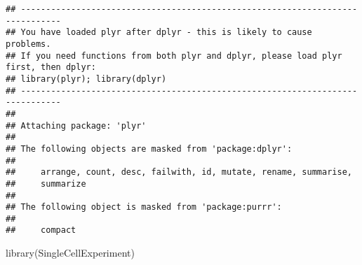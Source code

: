 \documentclass[
]{article}
\newenvironment{Shaded}{\begin{snugshade}}{\end{snugshade}}
\newcommand{\FunctionTok}[1]{\textcolor[rgb]{0.00,0.00,0.00}{#1}}
\newcommand{\NormalTok}[1]{#1}
\begin{document}
\begin{verbatim}
## ------------------------------------------------------------------------------
## You have loaded plyr after dplyr - this is likely to cause problems.
## If you need functions from both plyr and dplyr, please load plyr first, then dplyr:
## library(plyr); library(dplyr)
## ------------------------------------------------------------------------------
## 
## Attaching package: 'plyr'
## 
## The following objects are masked from 'package:dplyr':
## 
##     arrange, count, desc, failwith, id, mutate, rename, summarise,
##     summarize
## 
## The following object is masked from 'package:purrr':
## 
##     compact
\end{verbatim}

\begin{Shaded}
\begin{Highlighting}[]
\FunctionTok{library}\NormalTok{(SingleCellExperiment)}
\end{Highlighting}
\end{Shaded}
\end{document}
